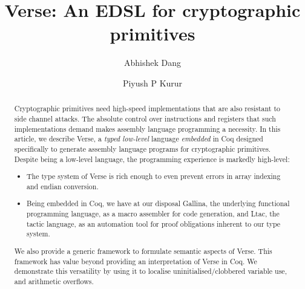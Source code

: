 \documentclass[sigconf,review,final]{acmart}\settopmatter{printfolios=true}%
\begin{document}
\title{Verse: An EDSL for cryptographic primitives}
\author{Abhishek Dang}

\author{Piyush P Kurur}

\begin{abstract}
  Cryptographic primitives need high-speed implementations that are
  also resistant to side channel attacks. The absolute control over
  instructions and registers that such implementations demand makes
  assembly language programming a necessity. In this article, we
  describe Verse, a \emph{typed low-level} language \emph{embedded} in
  Coq designed specifically to generate assembly language programs for
  cryptographic primitives. Despite being a low-level language, the
  programming experience is markedly high-level:

  \begin{itemize}
  \item The type system of Verse is rich enough to even prevent
    errors in array indexing and endian conversion.
  \item Being embedded in Coq, we have at our disposal Gallina, the
    underlying functional programming language, as a macro assembler
    for code generation, and Ltac, the tactic language, as an
    automation tool for proof obligations inherent to our type
    system.
  \end{itemize}

  We also provide a generic framework to formulate semantic aspects of
  Verse. This framework has value beyond providing an interpretation
  of Verse in Coq. We demonstrate this versatility by using it to
  localise uninitialised/clobbered variable use, and arithmetic
  overflows.









\end{abstract}
\end{document}
